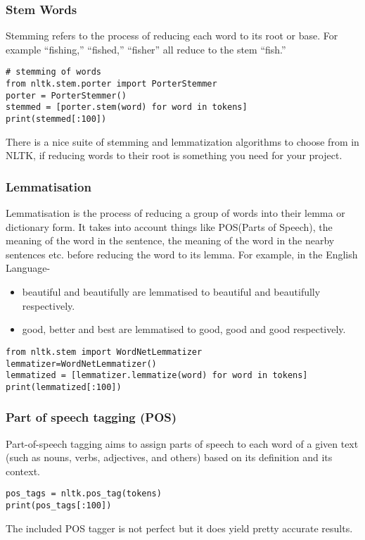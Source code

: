 \begin{frame}[fragile]
\frametitle{Stem Words}
Stemming refers to the process of reducing each word to its root or base.
For example “fishing,” “fished,” “fisher” all reduce to the stem “fish.”
\begin{lstlisting}
# stemming of words
from nltk.stem.porter import PorterStemmer
porter = PorterStemmer()
stemmed = [porter.stem(word) for word in tokens]
print(stemmed[:100])
\end{lstlisting}
There is a nice suite of stemming and lemmatization algorithms to choose from in NLTK, if reducing words to their root is something you need for your project.
\end{frame}


\begin{frame}[fragile]
\frametitle{Lemmatisation}
 Lemmatisation is the process of reducing a group of words into their lemma or dictionary form. It takes into account things like POS(Parts of Speech), the meaning of the word in the sentence, the meaning of the word in the nearby sentences etc. before reducing the word to its lemma. For example, in the English Language-
\begin{itemize}
\item beautiful and beautifully are lemmatised to beautiful and beautifully respectively.
\item good, better and best are lemmatised to good, good and good respectively.
\end{itemize}
\begin{lstlisting}
from nltk.stem import WordNetLemmatizer
lemmatizer=WordNetLemmatizer()
lemmatized = [lemmatizer.lemmatize(word) for word in tokens]
print(lemmatized[:100])
\end{lstlisting}
\end{frame}

\begin{frame}[fragile]
\frametitle{Part of speech tagging (POS)}
Part-of-speech tagging aims to assign parts of speech to each word of a given text (such as nouns, verbs, adjectives, and others) based on its definition and its context. 
\begin{lstlisting}
pos_tags = nltk.pos_tag(tokens)
print(pos_tags[:100])
\end{lstlisting}
The included POS tagger is not perfect but it does yield pretty accurate results.
\end{frame}


